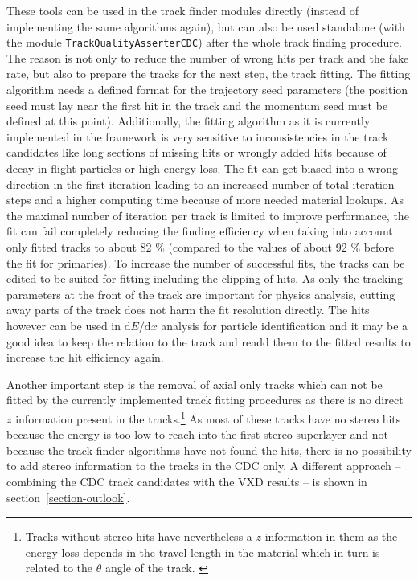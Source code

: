 These tools can be used in the track finder modules directly (instead of implementing the same algorithms again), but can also be used standalone (with the module \texttt{Track\-Quality\-Asserter\-CDC}) after the whole track finding procedure. The reason is not only to reduce the number of wrong hits per track and the fake rate, but also to prepare the tracks for the next step, the track fitting. The fitting algorithm needs a defined format for the trajectory seed parameters (the position seed must lay near the first hit in the track and the momentum seed must be defined at this point). Additionally, the fitting algorithm as it is currently implemented in the framework is very sensitive to inconsistencies in the track candidates like long sections of missing hits or wrongly added hits because of decay-in-flight particles or high energy loss. The fit can get biased into a wrong direction in the first iteration leading to an increased number of total iteration steps and a higher computing time because of more needed material lookups. As the maximal number of iteration per track is limited to improve performance, the fit can fail completely reducing the finding efficiency when taking into account only fitted tracks to about 82 \% (compared to the values of about 92 \% before the fit for primaries). To increase the number of successful fits, the tracks can be edited to be suited for fitting including the clipping of hits. As only the tracking parameters at the front of the track are important for physics analysis, cutting away parts of the track does not harm the fit resolution directly. The hits however can be used in $\mathrm d E/\mathrm d x$ analysis for particle identification and it may be a good idea to keep the relation to the track and readd them to the fitted results to increase the hit efficiency again. 

Another important step is the removal of axial only tracks which can not be fitted by the currently implemented track fitting procedures as there is no direct $z$ information present in the tracks.\footnote{Tracks without stereo hits have nevertheless a $z$ information in them as the energy loss depends in the travel length in the material which in turn is related to the $\theta$ angle of the track. \cite{martin}} As most of these tracks have no stereo hits because the energy is too low to reach into the first stereo superlayer and not because the track finder algorithms have not found the hits, there is no possibility to add stereo information to the tracks in the CDC only. A different approach -- combining the CDC track candidates with the VXD results -- is shown in section~\ref{section-outlook}.

